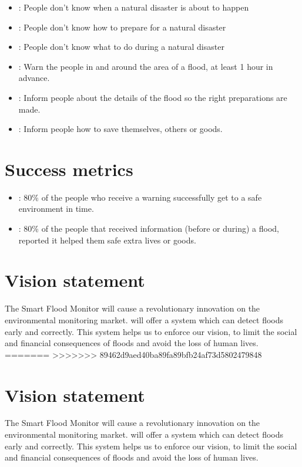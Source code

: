 \begin{itemize}
	\item {}: People don't know when a natural disaster is about to happen
	\item {}: People don't know how to prepare for a natural disaster
	\item {}: People don't know what to do during a natural disaster
\end{itemize}

\begin{itemize}
	\item {}: Warn the people in and around the area of a flood, at least 1 hour in advance.
	\item {}: Inform people about the details of the flood so the right preparations are made. 
	\item {}: Inform people how to save themselves, others or goods.
\end{itemize}

\section{Success metrics}
\begin{itemize}
	\item {}: 80\% of the people who receive a warning successfully get to a safe environment in time.
	\item {}: 80\% of the people that received information (before or during) a flood, reported it helped them safe extra lives or goods.
\end{itemize}

\section{Vision statement}
The Smart Flood Monitor will cause a revolutionary innovation on the environmental monitoring market. \CompanyName will offer a system which can detect floods early and correctly. This system helps us to enforce our vision, to limit the social and financial consequences of floods and avoid the loss of human lives. 
=======
>>>>>>> 89462d9aed40ba89fa89bfb24af73d5802479848

\section{Vision statement}
The Smart Flood Monitor will cause a revolutionary innovation on the environmental monitoring market. \CompanyName will offer a system which can detect floods early and correctly. This system helps us to enforce our vision, to limit the social and financial consequences of floods and avoid the loss of human lives. \\

